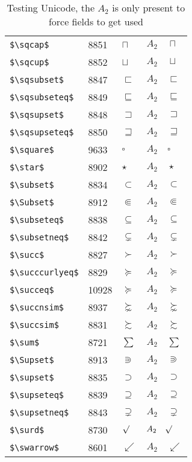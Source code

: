 \documentclass{article}
\begin{document}
\begin{table}
\begin{center}
\begin{tabular}{llll}
 \verb#$\sqcap$#              & 8851 & $\sqcap$              & $A_2\quad \sqcap$\\
 \verb#$\sqcup$#              & 8852 & $\sqcup$              & $A_2\quad \sqcup$\\
 \verb#$\sqsubset$#           & 8847 & $\sqsubset$           & $A_2\quad \sqsubset$\\
 \verb#$\sqsubseteq$#         & 8849 & $\sqsubseteq$         & $A_2\quad \sqsubseteq$\\
 \verb#$\sqsupset$#           & 8848 & $\sqsupset$           & $A_2\quad \sqsupset$\\
 \verb#$\sqsupseteq$#         & 8850 & $\sqsupseteq$         & $A_2\quad \sqsupseteq$\\
 \verb#$\square$#             & 9633 & $\square$             & $A_2\quad \square$\\
 \verb#$\star$#               & 8902 & $\star$               & $A_2\quad \star$\\
 \verb#$\subset$#             & 8834 & $\subset$             & $A_2\quad \subset$\\
 \verb#$\Subset$#             & 8912 & $\Subset$             & $A_2\quad \Subset$\\
 \verb#$\subseteq$#           & 8838 & $\subseteq$           & $A_2\quad \subseteq$\\
 \verb#$\subsetneq$#          & 8842 & $\subsetneq$          & $A_2\quad \subsetneq$\\
 \verb#$\succ$#               & 8827 & $\succ$               & $A_2\quad \succ$\\
 \verb#$\succcurlyeq$#        & 8829 & $\succcurlyeq$        & $A_2\quad \succcurlyeq$\\
 \verb#$\succeq$#            & 10928 & $\succeq$             & $A_2\quad \succeq$\\
 \verb#$\succnsim$#           & 8937 & $\succnsim$           & $A_2\quad \succnsim$\\
 \verb#$\succsim$#            & 8831 & $\succsim$            & $A_2\quad \succsim$\\
 \verb#$\sum$#                & 8721 & $\sum$                & $A_2\quad \sum$\\
 \verb#$\Supset$#             & 8913 & $\Supset$             & $A_2\quad \Supset$\\
 \verb#$\supset$#             & 8835 & $\supset$             & $A_2\quad \supset$\\
 \verb#$\supseteq$#           & 8839 & $\supseteq$           & $A_2\quad \supseteq$\\
 \verb#$\supsetneq$#          & 8843 & $\supsetneq$          & $A_2\quad \supsetneq$\\
 \verb#$\surd$#               & 8730 & $\surd$               & $A_2\quad \surd$\\
 \verb#$\swarrow$#            & 8601 & $\swarrow$            & $A_2\quad \swarrow$\\
\end{tabular}
\end{center}
\caption{Testing Unicode, the $A_2$ is only present to force fields to get used}
\end{table}
\end{document}
